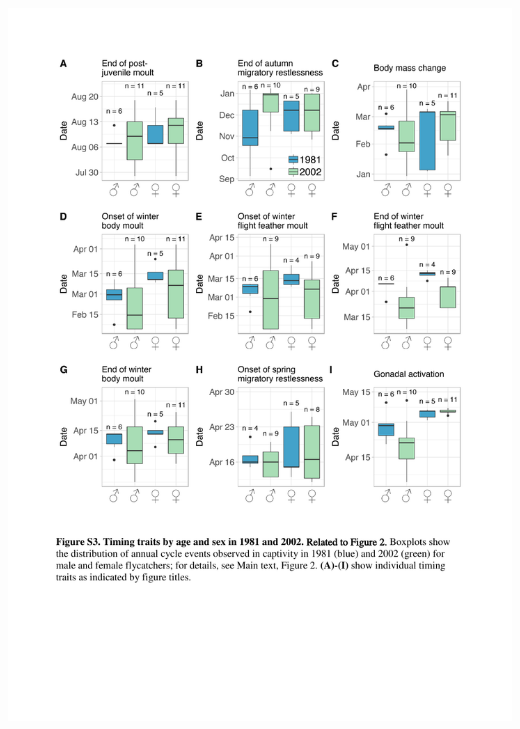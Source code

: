 \documentclass[a4paper, twoside]{templates/ociamthesis}
\begin{document}
\includegraphics[width=1\linewidth]{pdf_chapters/pied/pied_supp_crop_Part4}
\end{document}
